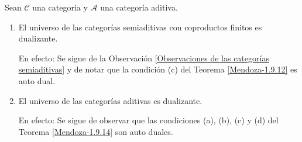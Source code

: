 \documentclass[tesis]{subfiles}
\begin{document}
\begin{Obs}\label{Mendoza-1.9.15}

    Sean $\mathscr{C}$ una categoría y $\mathscr{A}$ una categoría aditiva.

    \begin{enumerate}[label=(\arabic*)]
    
        \item El universo de las categorías semiaditivas con coproductos finitos es dualizante. %

            En efecto: Se sigue de la Observación \ref{Observaciones de las categorías semiaditivas} y de notar que la condición (c) del Teorema \ref{Mendoza-1.9.12} es auto dual. %

        \item El universo de las categorías aditivas es dualizante.

            En efecto: Se sigue de observar que las condiciones (a), (b), (c) y (d) del Teorema \ref{Mendoza-1.9.14} son auto duales.

    \end{enumerate}
\end{Obs}
\end{document}
